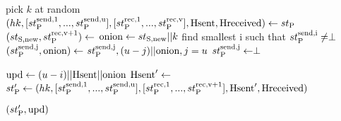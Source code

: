 \algrenewcommand\textproc{}
\algrenewcommand{}

\begin{minipage}{\linewidth}
  {\fontsize{8}{10}\selectfont
  \begin{algorithmic}[1]
    \State pick $k$ at random
    \State $(hk, [st_\text{P}^\text{send,1},...,st_\text{P}^\text{send,u}],
                 [st_\text{P}^\text{rec,1},...,st_\text{P}^\text{rec,v}],
    \text{Hsent}, \text{Hreceived}) \gets st_\text{P}$
    \State $(st_\text{S,new},st_\text{P}^\text{rec,v+1}) \gets$ 
    \State $\text{onion} \gets st_\text{S,new} || k$
    \State find smallest i such that $st_\text{P}^\text{send,i} \neq \perp$
    \State $(st_\text{P}^\text{send,j},\text{onion}) \gets$ 
               {$st_\text{P}^\text{send,j},(u-j)||\text{onion},j=u$}
    \State $st_\text{P}^\text{send,j} \gets \perp$
    \EndIf
    \EndFor

    \State $\text{upd} \gets (u-i)||\text{Hsent}||\text{onion}$
    \State $\text{Hsent}' \gets$ 
    \State $st_\text{P}' \gets (hk,[st_\text{P}^\text{send,1},...,st_\text{P}^\text{send,u}],
                 [st_\text{P}^\text{rec,1},...,st_\text{P}^\text{rec,v+1}], \text{Hsent}', \text{Hreceived})$

    \State \Return $(st_\text{P}', \text{upd})$
    \EndProcedure
  \end{algorithmic}
  }
\end{minipage}
